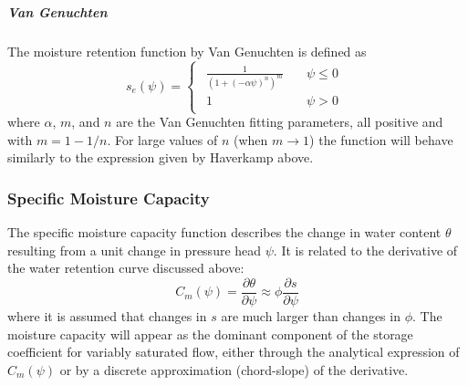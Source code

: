 \documentclass[fleqn]{article}
\begin{document}
\subparagraph{Van Genuchten}
The moisture retention function by Van Genuchten \cite{vangenuchten-1980}
is defined as
\begin{equation}
  s_e(\psi) =
  \begin{cases}
    \begin{aligned}
      \frac{1}
      {
        \left( 1 + \left( -\alpha\psi \right)^{n}
        \right)^{m}
      } \quad & \psi \leq 0 \\
      1 \quad & \psi > 0
    \end{aligned}
  \end{cases}
  \label{eq-seff-vanGenuchten}
\end{equation}
where $\alpha$, $m$, and $n$ are the Van Genuchten fitting parameters, 
all positive and with $m = 1 - 1/n$. For large
values of $n$ (when $m \rightarrow 1$) the function will behave similarly
to the expression given by Haverkamp above.

\subsubsection{Specific Moisture Capacity}
The specific moisture capacity function describes the change in water content
$\theta$ resulting from a unit change in pressure head $\psi$. It is related to the derivative of the water retention curve discussed above:
\begin{equation}
  C_m(\psi) = \frac{\partial \theta}{\partial \psi} \approx
  \phi \frac{\partial s}{\partial \psi}
  \label{eq-C-related-to-WRC}
\end{equation}
where it is assumed that changes in $s$ are much larger than changes in $\phi$.
The moisture capacity will appear as the dominant component of the storage
coefficient for variably saturated flow, either through the analytical expression
of $C_m(\psi)$ or by a discrete approximation (chord-slope) of the derivative.
\end{document}
